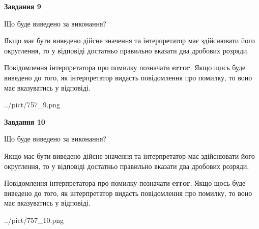 \documentclass[12pt, ukrainian]{article}
\begin{document}
{\begin {Large}
{\begin {center}\textbf{Завдання 9}\end {center}}\par
Що буде виведено за виконання? \par

Якщо має бути виведено дійсне значення та інтерпретатор має здійснювати його округлення, 
то у відповіді достатньо правильно вказати два дробових розряди.

Повідомлення інтерпретатора про помилку позначати \textbf{error}.
Якщо щось буде виведено до того, як інтерпретатор видасть повідомлення про помилку, 
то воно має вказуватись у відповіді. \par

\begin{center}
	{../pict/757_9.png}
\end{center}
\newpage

{\begin {center}\textbf{Завдання 10}\end {center}}\par
Що буде виведено за виконання? \par

Якщо має бути виведено дійсне значення та інтерпретатор має здійснювати його округлення, 
то у відповіді достатньо правильно вказати два дробових розряди.

Повідомлення інтерпретатора про помилку позначати \textbf{error}.
Якщо щось буде виведено до того, як інтерпретатор видасть повідомлення про помилку, 
то воно має вказуватись у відповіді. \par

\begin{center}
	{../pict/757_10.png}
\end{center}
\newpage

\end {Large}}
\end{document}
